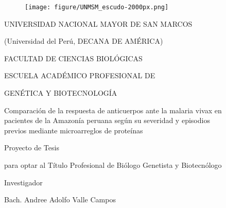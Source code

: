 \documentclass[]{article}
\title{}
\author{}
\date{}
\begin{document}
\renewcommand{\contentsname}{Índice General} 
\renewcommand{\tablename}{Tabla}
\renewcommand{\tableautorefname}{Tabla}


\clearpage
{}

\begin{centering}

\begin{figure}[!ht]
  \begin{center}
    \texttt{[image: figure/UNMSM\_escudo-2000px.png]}%
  \end{center}
\end{figure}

\Large %
UNIVERSIDAD NACIONAL MAYOR DE SAN MARCOS

\large
(Universidad del Perú, DECANA DE AMÉRICA)

\vspace{.3 cm}

\Large
FACULTAD DE CIENCIAS BIOLÓGICAS

\vspace{.3 cm}

\normalsize
ESCUELA ACADÉMICO PROFESIONAL DE

GENÉTICA Y BIOTECNOLOGÍA

\vspace{2.3 cm}

\Large
Comparación de la respuesta de anticuerpos ante la %
malaria vivax 
en \\pacientes de la Amazonía peruana %
según su severidad y episodios \\previos %
mediante microarreglos de proteínas

\vspace{2.3 cm}

\large
Proyecto de Tesis 

para optar al Título Profesional de Biólogo Genetista y Biotecnólogo

\vspace{.3 cm}

\large
Investigador

Bach. Andree Adolfo Valle Campos


\end{centering}
\end{document}
